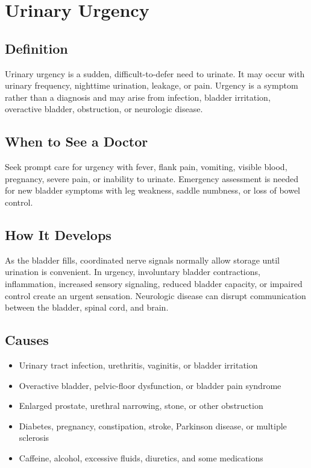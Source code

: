 \chapter{Urinary Urgency}

\section*{Definition}
Urinary urgency is a sudden, difficult-to-defer need to urinate. It may occur with urinary frequency, nighttime urination, leakage, or pain. Urgency is a symptom rather than a diagnosis and may arise from infection, bladder irritation, overactive bladder, obstruction, or neurologic disease.

\section*{When to See a Doctor}
Seek prompt care for urgency with fever, flank pain, vomiting, visible blood, pregnancy, severe pain, or inability to urinate. Emergency assessment is needed for new bladder symptoms with leg weakness, saddle numbness, or loss of bowel control.

\section*{How It Develops}
As the bladder fills, coordinated nerve signals normally allow storage until urination is convenient. In urgency, involuntary bladder contractions, inflammation, increased sensory signaling, reduced bladder capacity, or impaired control create an urgent sensation. Neurologic disease can disrupt communication between the bladder, spinal cord, and brain.

\section*{Causes}
\begin{itemize}
  \item Urinary tract infection, urethritis, vaginitis, or bladder irritation
  \item Overactive bladder, pelvic-floor dysfunction, or bladder pain syndrome
  \item Enlarged prostate, urethral narrowing, stone, or other obstruction
  \item Diabetes, pregnancy, constipation, stroke, Parkinson disease, or multiple sclerosis
  \item Caffeine, alcohol, excessive fluids, diuretics, and some medications
\end{itemize}

